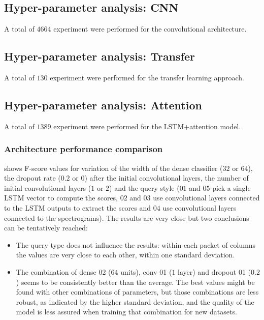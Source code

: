 \subsection{Hyper-parameter analysis: CNN}


A total of $4664$ experiment were performed for the convolutional architecture.

\subsection{Hyper-parameter analysis: Transfer}

A total of $130$ experiment were performed for the transfer learning approach.

\subsection{Hyper-parameter analysis: Attention}

A total of $1389$ experiment were performed for the LSTM+attention model.

\subsubsection{Architecture performance comparison}

 shows F-score values for 
variation of 
the width of the dense classifier ($32$ or $64$),
the dropout rate ($0.2$ or $0$) after the initial convolutional layers,
the number of initial convolutional layers ($1$ or $2$)
and
the query style ($01$ and $05$ pick a single LSTM vector to compute the scores,
$02$ and $03$ use convolutional layers connected to the LSTM outputs to extract
the scores and $04$  use convolutional layers connected to the spectrograms).
The results are very close but two conclusions can be tentatively reached:

\begin{itemize}
    \item The query type does not influence
the results: within each packet of columns the values are very close to each
other, within one standard deviation.
    \item The combination of dense 02 ($64$ units), conv 01 ($1$ layer) and dropout 01 ($0.2$)
seems to be consistently better than the average.
The best values might be found with other combinations of parameters, but those
combinations are less robust, as indicated by the higher standard deviation,
and the quality of the model is less assured when training that combination for
new datasets.
\end{itemize}

